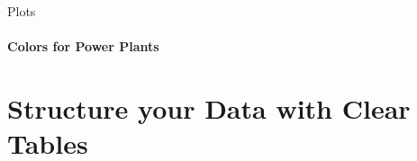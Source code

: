 \documentclass[aspectratio=169]{beamer}
\begin{document}
\begin{frame}{Plots}
    \framesubtitle{Colors for Power Plants}

    \begin{table}[htbp]
        \scalebox{0.94}{
            
        }
    \end{table}

\end{frame}


\section{\textbf{Structure} your \textbf{Data} with Clear \textbf{Tables}}

\begin{frame}
    \agenda     
\end{frame}
\end{document}
